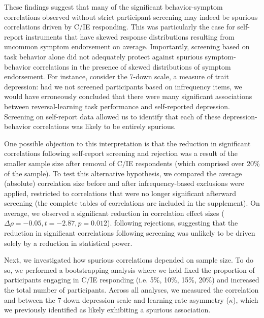 \documentclass[a4paper,notitlepage,12pt]{article}
\begin{document}
These findings suggest that many of the significant behavior-symptom correlations observed without strict participant screening may indeed be spurious correlations driven by C/IE responding. This was particularly the case for self-report instruments that have skewed response distributions resulting from uncommon symptom endorsement on average. Importantly, screening based on task behavior alone did not adequately protect against spurious symptom-behavior correlations in the presence of skewed distributions of symptom endorsement. For instance, consider the 7-down scale, a measure of trait depression: had we not screened participants based on infrequency items, we would have erroneously concluded that there were many significant associations between reversal-learning task performance and self-reported depression. Screening on self-report data allowed us to identify that each of these depression-behavior correlations was likely to be entirely spurious.

One possible objection to this interpretation is that the reduction in significant correlations following self-report screening and rejection was a result of the smaller sample size after removal of C/IE respondents (which comprised over 20\% of the sample). To test this alternative hypothesis, we compared the average (absolute) correlation size before and after infrequency-based exclusions were applied, restricted to correlations that were no longer significant afterward screening (the complete tables of correlations are included in the supplement). On average, we observed a significant reduction in correlation effect sizes ($\Delta \rho = -0.05, t = -2.87, p = 0.012$). following rejections, suggesting that the reduction in significant correlations following screening was unlikely to be driven solely by a reduction in statistical power. 

Next, we investigated how spurious correlations depended on sample size. To do so, we performed a bootstrapping analysis where we held fixed the proportion of participants engaging in C/IE responding (i.e. 5\%, 10\%, 15\%, 20\%) and increased the total number of participants. Across all analyses, we measured the correlation and between the 7-down depression scale and learning-rate asymmetry ($\kappa$), which we previously identified as likely exhibiting a spurious association. 
\end{document}
